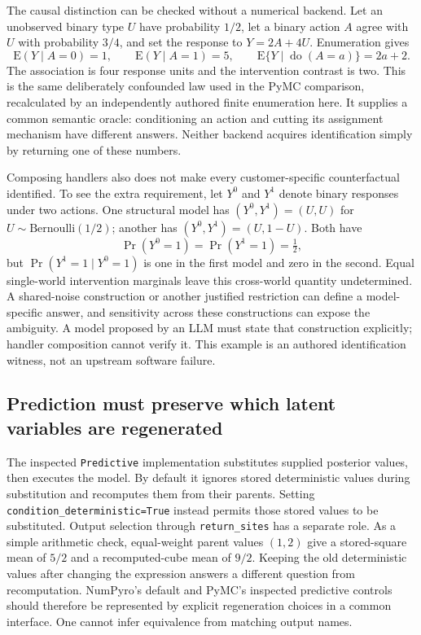 The causal distinction can be checked without a numerical backend. Let an unobserved binary type $U$ have probability $1/2$, let a binary action $A$ agree with $U$ with probability $3/4$, and set the response to $Y=2A+4U$. Enumeration gives
\begin{equation}
 \mathrm{E}(Y\mid A=0)=1,\qquad
 \mathrm{E}(Y\mid A=1)=5,\qquad
 \mathrm{E}\{Y\mid\operatorname{do}(A=a)\}=2a+2.
\end{equation}
The association is four response units and the intervention contrast is two. This is the same deliberately confounded law used in the PyMC comparison, recalculated by an independently authored finite enumeration here. It supplies a common semantic oracle: conditioning an action and cutting its assignment mechanism have different answers. Neither backend acquires identification simply by returning one of these numbers. \citep{exec23_pymc_reference,exec23_numpyro_reference}

Composing handlers also does not make every customer-specific counterfactual identified. To see the extra requirement, let $Y^0$ and $Y^1$ denote binary responses under two actions. One structural model has $(Y^0,Y^1)=(U,U)$ for $U\sim\mathrm{Bernoulli}(1/2)$; another has $(Y^0,Y^1)=(U,1-U)$. Both have
\begin{equation}
 \Pr(Y^0=1)=\Pr(Y^1=1)=\tfrac12,
\end{equation}
but $\Pr(Y^1=1\mid Y^0=1)$ is one in the first model and zero in the second. Equal single-world intervention marginals leave this cross-world quantity undetermined. A shared-noise construction or another justified restriction can define a model-specific answer, and sensitivity across these constructions can expose the ambiguity. A model proposed by an LLM must state that construction explicitly; handler composition cannot verify it. This example is an authored identification witness, not an upstream software failure. \citep{exec23_numpyro_reference}

\subsection{Prediction must preserve which latent variables are regenerated}

The inspected \texttt{Predictive} implementation substitutes supplied posterior values, then executes the model. By default it ignores stored deterministic values during substitution and recomputes them from their parents. Setting \texttt{condition\_deterministic=True} instead permits those stored values to be substituted. Output selection through \texttt{return\_sites} has a separate role. As a simple arithmetic check, equal-weight parent values $(1,2)$ give a stored-square mean of $5/2$ and a recomputed-cube mean of $9/2$. Keeping the old deterministic values after changing the expression answers a different question from recomputation. NumPyro's default and PyMC's inspected predictive controls should therefore be represented by explicit regeneration choices in a common interface. One cannot infer equivalence from matching output names. \citep{exec23_numpyro_sources,exec23_pymc_sources,exec23_numpyro_reference}

